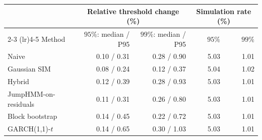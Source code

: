 \begin{tabular}{lrrrr}
\toprule
 & \multicolumn{2}{c}{Relative threshold change (\%)} & \multicolumn{2}{c}{Simulation rate (\%)} \\
\cmidrule(lr){2-3} \cmidrule(lr){4-5}
Method & $95\%$: median / P95 & $99\%$: median / P95 & $95\%$ & $99\%$ \\
\midrule
Naive & 0.10 / 0.31 & 0.28 / 0.90 & 5.03 & 1.01 \\
Gaussian SIM & 0.08 / 0.24 & 0.12 / 0.37 & 5.04 & 1.02 \\
Hybrid & 0.12 / 0.39 & 0.28 / 0.93 & 5.03 & 1.01 \\
JumpHMM-on-residuals & 0.11 / 0.31 & 0.26 / 0.80 & 5.03 & 1.01 \\
Block bootstrap & 0.14 / 0.45 & 0.22 / 0.72 & 5.03 & 1.01 \\
GARCH(1,1)-$t$ & 0.14 / 0.65 & 0.30 / 1.03 & 5.03 & 1.01 \\
\bottomrule
\end{tabular}
